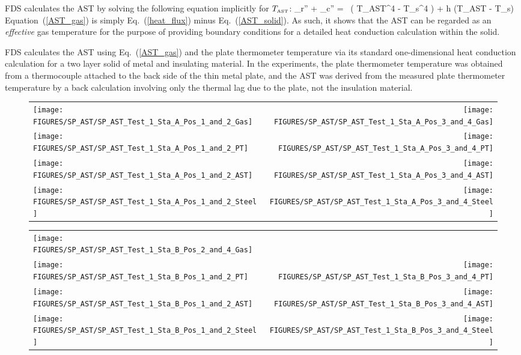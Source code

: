 FDS calculates the AST by solving the following equation implicitly for $T_{\hbox{\tiny AST}}$:
\be {}_r'' + _c'' = \epsilon \, \left( \sigma T_{\hbox{\tiny AST}}^4 - \sigma T_s^4 \right) + h (T_{\hbox{\tiny AST}} - T_s)  \label{AST_gas} \ee
Equation~(\ref{AST_gas}) is simply Eq.~(\ref{heat_flux}) minus Eq.~(\ref{AST_solid}). As such, it shows that the AST can be regarded as an {\em effective} gas temperature for
the purpose of providing boundary conditions for a detailed heat conduction calculation within the solid.

FDS calculates the AST using Eq.~(\ref{AST_gas}) and the plate thermometer temperature via its standard one-dimensional heat conduction calculation for a
two layer solid of metal and insulating material. In the experiments, the plate thermometer temperature was obtained from a thermocouple attached to the back side of
the thin metal plate, and the AST was derived from the measured plate thermometer temperature by a back calculation involving only the thermal lag due to the
plate, not the insulation material.

\newpage


\begin{figure}[p]
\begin{tabular*}{\textwidth}{l@{\extracolsep{\fill}}r}
\texttt{[image: FIGURES/SP\_AST/SP\_AST\_Test\_1\_Sta\_A\_Pos\_1\_and\_2\_Gas]} &
\texttt{[image: FIGURES/SP\_AST/SP\_AST\_Test\_1\_Sta\_A\_Pos\_3\_and\_4\_Gas]} \\
\texttt{[image: FIGURES/SP\_AST/SP\_AST\_Test\_1\_Sta\_A\_Pos\_1\_and\_2\_PT]} &
\texttt{[image: FIGURES/SP\_AST/SP\_AST\_Test\_1\_Sta\_A\_Pos\_3\_and\_4\_PT]} \\
\texttt{[image: FIGURES/SP\_AST/SP\_AST\_Test\_1\_Sta\_A\_Pos\_1\_and\_2\_AST]} &
\texttt{[image: FIGURES/SP\_AST/SP\_AST\_Test\_1\_Sta\_A\_Pos\_3\_and\_4\_AST]} \\
\texttt{[image: FIGURES/SP\_AST/SP\_AST\_Test\_1\_Sta\_A\_Pos\_1\_and\_2\_Steel]} &
\texttt{[image: FIGURES/SP\_AST/SP\_AST\_Test\_1\_Sta\_A\_Pos\_3\_and\_4\_Steel]}
\end{tabular*}
\label{SP_Test_1_Station_A}
\end{figure}

\begin{figure}[p]
\begin{tabular*}{\textwidth}{l@{\extracolsep{\fill}}r}
\texttt{[image: FIGURES/SP\_AST/SP\_AST\_Test\_1\_Sta\_B\_Pos\_2\_and\_4\_Gas]} &
  \\
\texttt{[image: FIGURES/SP\_AST/SP\_AST\_Test\_1\_Sta\_B\_Pos\_1\_and\_2\_PT]} &
\texttt{[image: FIGURES/SP\_AST/SP\_AST\_Test\_1\_Sta\_B\_Pos\_3\_and\_4\_PT]} \\
\texttt{[image: FIGURES/SP\_AST/SP\_AST\_Test\_1\_Sta\_B\_Pos\_1\_and\_2\_AST]} &
\texttt{[image: FIGURES/SP\_AST/SP\_AST\_Test\_1\_Sta\_B\_Pos\_3\_and\_4\_AST]} \\
\texttt{[image: FIGURES/SP\_AST/SP\_AST\_Test\_1\_Sta\_B\_Pos\_1\_and\_2\_Steel]} &
\texttt{[image: FIGURES/SP\_AST/SP\_AST\_Test\_1\_Sta\_B\_Pos\_3\_and\_4\_Steel]}
\end{tabular*}
\label{SP_Test_1_Station_B}
\end{figure}

